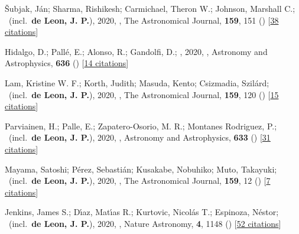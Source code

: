 \item[{\color{numcolor}\scriptsize23}] {\v{S}}ubjak, J{\'a}n; Sharma, Rishikesh; Carmichael, Theron W.; Johnson, Marshall C.; \etal\ (incl.\ \textbf{de Leon, J. P.}), 2020, , The Astronomical Journal, \textbf{159}, 151 () [\href{https://ui.adsabs.harvard.edu/abs/2020AJ....159..151S}{38 citations}]

\item[{\color{numcolor}\scriptsize22}] Hidalgo, D.; Pall{\'e}, E.; Alonso, R.; Gandolfi, D.; \etal, 2020, , Astronomy and Astrophysics, \textbf{636} () [\href{https://ui.adsabs.harvard.edu/abs/2020A&A...636A..89H}{14 citations}]

\item[{\color{numcolor}\scriptsize21}] Lam, Kristine W. F.; Korth, Judith; Masuda, Kento; Csizmadia, Szil{\'a}rd; \etal\ (incl.\ \textbf{de Leon, J. P.}), 2020, , The Astronomical Journal, \textbf{159}, 120 () [\href{https://ui.adsabs.harvard.edu/abs/2020AJ....159..120L}{15 citations}]

\item[{\color{numcolor}\scriptsize20}] Parviainen, H.; Palle, E.; Zapatero-Osorio, M. R.; Montanes Rodriguez, P.; \etal\ (incl.\ \textbf{de Leon, J. P.}), 2020, , Astronomy and Astrophysics, \textbf{633} () [\href{https://ui.adsabs.harvard.edu/abs/2020A&A...633A..28P}{31 citations}]

\item[{\color{numcolor}\scriptsize19}] Mayama, Satoshi; P{\'e}rez, Sebasti{\'a}n; Kusakabe, Nobuhiko; Muto, Takayuki; \etal\ (incl.\ \textbf{de Leon, J. P.}), 2020, , The Astronomical Journal, \textbf{159}, 12 () [\href{https://ui.adsabs.harvard.edu/abs/2020AJ....159...12M}{7 citations}]

\item[{\color{numcolor}\scriptsize18}] Jenkins, James S.; D{\'\i}az, Mat{\'\i}as R.; Kurtovic, Nicol{\'a}s T.; Espinoza, N{\'e}stor; \etal\ (incl.\ \textbf{de Leon, J. P.}), 2020, , Nature Astronomy, \textbf{4}, 1148 () [\href{https://ui.adsabs.harvard.edu/abs/2020NatAs...4.1148J}{52 citations}]

